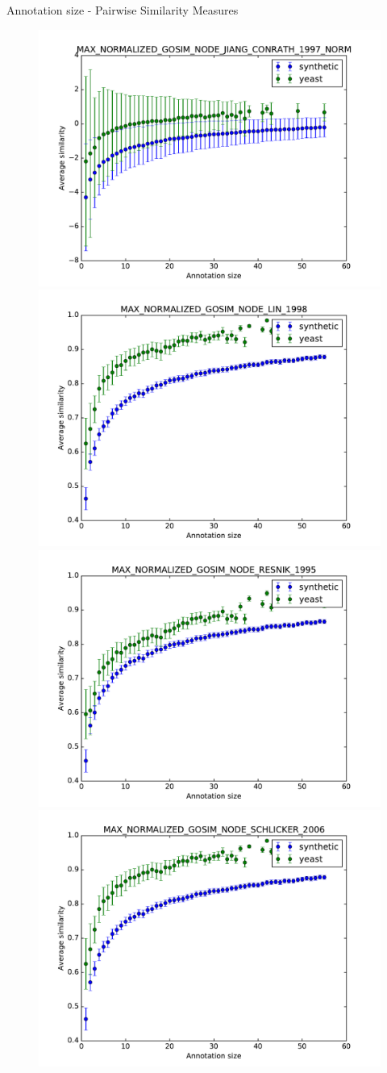 \documentclass{beamer}
\begin{document}
\begin{frame}{Annotation size - Pairwise Similarity Measures}

\begin{figure}
\includegraphics[width=0.5\linewidth, height=0.4\textheight]{pairwise/SIM_GROUPWISE_MAX_NORMALIZED_GOSIM_SIM_PAIRWISE_DAG_NODE_JIANG_CONRATH_1997_NORM_avg.pdf}
\includegraphics[width=0.5\linewidth, height=0.4\textheight]{pairwise/SIM_GROUPWISE_MAX_NORMALIZED_GOSIM_SIM_PAIRWISE_DAG_NODE_LIN_1998_avg.pdf} \\
\includegraphics[width=0.5\linewidth, height=0.4\textheight]{pairwise/SIM_GROUPWISE_MAX_NORMALIZED_GOSIM_SIM_PAIRWISE_DAG_NODE_RESNIK_1995_avg.pdf}
\includegraphics[width=0.5\linewidth, height=0.4\textheight]{pairwise/SIM_GROUPWISE_MAX_NORMALIZED_GOSIM_SIM_PAIRWISE_DAG_NODE_SCHLICKER_2006_avg.pdf}
\end{figure}

\end{frame}
\end{document}
